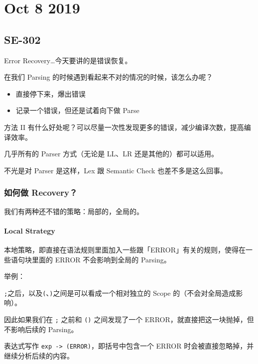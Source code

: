 \documentclass[
]{article}
\date{}
\begin{document}
\hypertarget{header-n0}{%
\section{Oct 8 2019}\label{header-n0}}

\hypertarget{header-n2}{%
\subsection{SE-302}\label{header-n2}}

Error Recovery\ldots 今天要讲的是错误恢复。

在我们 Parsing 的时候遇到看起来不对的情况的时候，该怎么办呢？

\begin{itemize}
\item
  直接停下来，爆出错误
\item
  记录一个错误，但还是试着向下做 Parse
\end{itemize}

方法 II
有什么好处呢？可以尽量一次性发现更多的错误，减少编译次数，提高编译效率。

几乎所有的 Parser 方式（无论是 LL、LR 还是其他的）都可以适用。

不光是对 Parser 是这样，Lex 跟 Semantic Check 也差不多是这么回事。

\hypertarget{header-n13}{%
\subsubsection{如何做 Recovery？}\label{header-n13}}

我们有两种还不错的策略：局部的，全局的。

\hypertarget{header-n15}{%
\paragraph{Local Strategy}\label{header-n15}}

本地策略，即直接在语法规则里面加入一些跟「ERROR」有关的规则，使得在一些语句块里面的
ERROR 不会影响到全局的 Parsing。

举例：

\texttt{;}之后，以及\texttt{(}、\texttt{)}之间是可以看成一个相对独立的
Scope 的（不会对全局造成影响）。

因此如果我们在 \texttt{;} 之前和 \texttt{()} 之间发现了一个
ERROR，就直接把这一块抛掉，但不影响后续的 Parsing。

表达式写作 \texttt{exp\ -\textgreater{}\ (ERROR)}，即括号中包含一个
ERROR 时会被直接忽略掉，并继续分析后续的内容。
\end{document}
